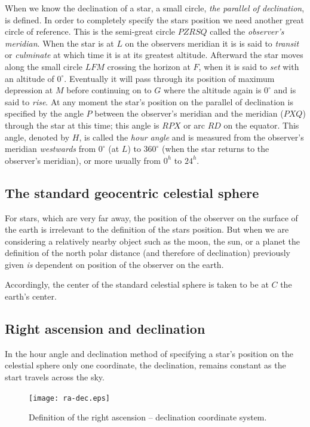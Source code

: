 When we know the declination of a star, a small circle, {\it the
  parallel of declination}, is defined. In order to completely
specify the stars position we need another great circle of
reference. This is the semi-great circle $PZRSQ$ called the {\it
  observer's meridian}. When the star is at $L$ on the observers
meridian it is is said to {\it transit} or {\it culminate} at which
time it is at its greatest altitude. Afterward the star moves along
the small circle $LFM$ crossing the horizon at $F$, when it is said to
{\it set} with an altitude of $0^\circ$. Eventually it will pass through
its position of maximum depression at $M$ before continuing on to $G$
where the altitude again is $0^\circ$ and is said to {\it rise}. At
any moment the star's position on the parallel of declination is
specified by the angle $P$ between the observer's meridian and the
meridian ($PXQ$) through the star at this time; this angle is $RPX$ or
arc $RD$ on the equator. This angle, denoted by $H$, is called the
{\it hour angle} and is measured from the observer's meridian {\it
  westwards} from $0^\circ$ (at $L$) to $360^\circ$ (when the star
returns to the observer's meridian), or more usually from $0^h$ to 
$24^h$. 

\subsection{The standard geocentric celestial sphere}

For stars, which are very far away, the position of the observer on
the surface of the earth is irrelevant to the definition of the stars
position. But when we are considering a relatively nearby object such
as the moon, the sun, or a planet the definition of the north polar
distance (and therefore of declination) previously given {\it is}
dependent on position of the observer on the earth. 

Accordingly, the center of the standard celestial sphere is taken to
be at $C$ the earth's center. 

\subsection{Right ascension and declination}

In the hour angle and declination method of specifying a star's
position on the celestial sphere only one coordinate, the declination,
remains constant as the start travels across the sky. 

\begin{figure}[h]
\centering
\texttt{[image: ra-dec.eps]}
\caption{Definition of the right ascension -- declination coordinate system.}
\label{fig:ra-dec}
\end{figure}

